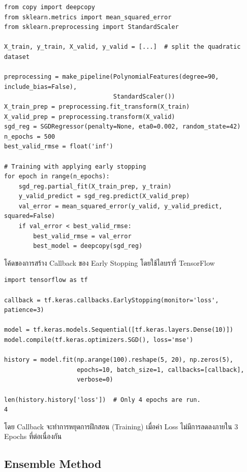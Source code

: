 \begin{lstlisting}[style=MyPython]
from copy import deepcopy
from sklearn.metrics import mean_squared_error
from sklearn.preprocessing import StandardScaler

X_train, y_train, X_valid, y_valid = [...]  # split the quadratic dataset

preprocessing = make_pipeline(PolynomialFeatures(degree=90, include_bias=False),
                              StandardScaler())
X_train_prep = preprocessing.fit_transform(X_train)
X_valid_prep = preprocessing.transform(X_valid)
sgd_reg = SGDRegressor(penalty=None, eta0=0.002, random_state=42)
n_epochs = 500
best_valid_rmse = float('inf')

# Training with applying early stopping
for epoch in range(n_epochs):
    sgd_reg.partial_fit(X_train_prep, y_train)
    y_valid_predict = sgd_reg.predict(X_valid_prep)
    val_error = mean_squared_error(y_valid, y_valid_predict, squared=False)
    if val_error < best_valid_rmse:
        best_valid_rmse = val_error
        best_model = deepcopy(sgd_reg)
\end{lstlisting}

\vspace{1em}
\noindent โค้ดของการสร้าง Callback ของ Early Stopping โดยใช้ไลบรารี่ TensorFlow 

\begin{lstlisting}[style=MyPython]
import tensorflow as tf

callback = tf.keras.callbacks.EarlyStopping(monitor='loss', patience=3)

model = tf.keras.models.Sequential([tf.keras.layers.Dense(10)])
model.compile(tf.keras.optimizers.SGD(), loss='mse')

history = model.fit(np.arange(100).reshape(5, 20), np.zeros(5),
                    epochs=10, batch_size=1, callbacks=[callback],
                    verbose=0)

len(history.history['loss'])  # Only 4 epochs are run.
4
\end{lstlisting}

\noindent โดย Callback จะทำการหยุดการฝึกสอน (Training) เมื่อค่า Loss ไม่มีการลดลงภายใน 3 Epochs ที่ต่อเนื่องกัน

\subsection{Ensemble Method}
\label{ssec:ensemble_model}

